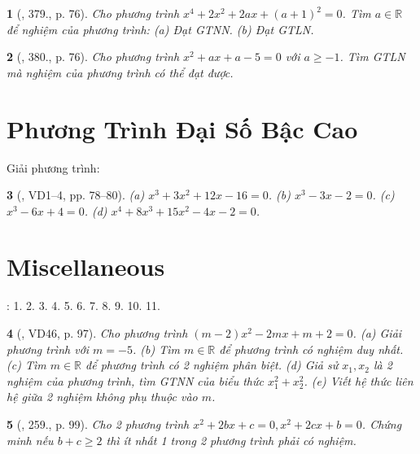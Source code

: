 \documentclass{article}
\newtheorem{baitoan}{}
\begin{document}
\begin{baitoan}[\cite{Binh_Toan_9_tap_2}, 379., p. 76]
	Cho phương trình $x^4 + 2x^2 + 2ax + (a + 1)^2 = 0$. Tìm $a\in\mathbb{R}$ để nghiệm của phương trình: (a) Đạt {\rm GTNN}. (b) Đạt {\rm GTLN}.
\end{baitoan}

\begin{baitoan}[\cite{Binh_Toan_9_tap_2}, 380., p. 76]
	Cho phương trình $x^2 + ax + a - 5 = 0$ với $a\ge-1$. Tìm {\rm GTLN} mà nghiệm của phương trình có thể đạt được.
\end{baitoan}


\section{Phương Trình Đại Số Bậc Cao}
Giải phương trình:

\begin{baitoan}[\cite{Binh_Toan_9_tap_2}, VD1--4, pp. 78--80]
	(a) $x^3 + 3x^2 + 12x - 16 = 0$. (b) $x^3 - 3x - 2 = 0$. (c) $x^3 - 6x + 4 = 0$. (d) $x^4 + 8x^3 + 15x^2 - 4x - 2 = 0$.
\end{baitoan}


\section{Miscellaneous}
\cite[BTCCVII, \S3, pp. 66--67]{SGK_Toan_9_Canh_Dieu_tap_2}: 1. 2. 3. 4. 5. 6. 7. 8. 9. 10. 11.

\begin{baitoan}[\cite{Tuyen_Toan_9_old}, VD46, p. 97]
	Cho phương trình $(m - 2)x^2 - 2mx + m + 2 = 0$. (a) Giải phương trình với $m = -5$. (b) Tìm $m\in\mathbb{R}$ để phương trình có nghiệm duy nhất. (c) Tìm $m\in\mathbb{R}$ để phương trình có 2 nghiệm phân biệt. (d) Giả sử $x_1,x_2$ là 2 nghiệm của phương trình, tìm {\rm GTNN} của biểu thức $x_1^2 + x_2^2$. (e) Viết hệ thức liên hệ giữa 2 nghiệm không phụ thuộc vào $m$.
\end{baitoan}

\begin{baitoan}[\cite{Tuyen_Toan_9_old}, 259., p. 99]
	Cho 2 phương trình $x^2 + 2bx + c = 0,x^2 + 2cx + b = 0$. Chứng minh nếu $b + c\ge2$ thì ít nhất 1 trong 2 phương trình phải có nghiệm.
\end{baitoan}
\end{document}
